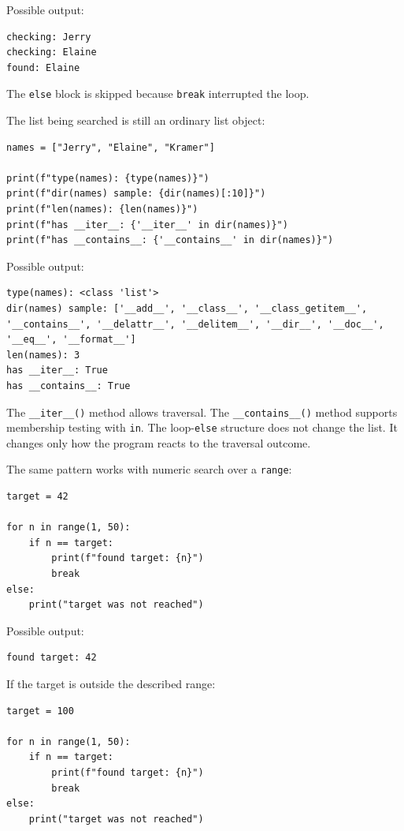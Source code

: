 Possible output:

\begin{verbatim}
checking: Jerry
checking: Elaine
found: Elaine
\end{verbatim}

The \texttt{else} block is skipped because \texttt{break} interrupted the loop.

The list being searched is still an ordinary list object:

\begin{verbatim}
names = ["Jerry", "Elaine", "Kramer"]

print(f"type(names): {type(names)}")
print(f"dir(names) sample: {dir(names)[:10]}")
print(f"len(names): {len(names)}")
print(f"has __iter__: {'__iter__' in dir(names)}")
print(f"has __contains__: {'__contains__' in dir(names)}")
\end{verbatim}

Possible output:

\begin{verbatim}
type(names): <class 'list'>
dir(names) sample: ['__add__', '__class__', '__class_getitem__',
'__contains__', '__delattr__', '__delitem__', '__dir__', '__doc__',
'__eq__', '__format__']
len(names): 3
has __iter__: True
has __contains__: True
\end{verbatim}

The \texttt{\_\_iter\_\_()} method allows traversal. The \texttt{\_\_contains\_\_()} method supports membership testing with \texttt{in}. The loop-\texttt{else} structure does not change the list. It changes only how the program reacts to the traversal outcome.

The same pattern works with numeric search over a \texttt{range}:

\begin{verbatim}
target = 42

for n in range(1, 50):
    if n == target:
        print(f"found target: {n}")
        break
else:
    print("target was not reached")
\end{verbatim}

Possible output:

\begin{verbatim}
found target: 42
\end{verbatim}

If the target is outside the described range:

\begin{verbatim}
target = 100

for n in range(1, 50):
    if n == target:
        print(f"found target: {n}")
        break
else:
    print("target was not reached")
\end{verbatim}

